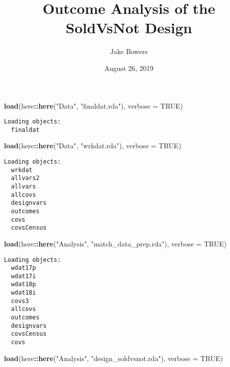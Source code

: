 \documentclass[11pt,]{article}
\title{Outcome Analysis of the SoldVsNot Design}
\author{Jake Bowers}
\date{August 26, 2019}
\newenvironment{Shaded}{\begin{snugshade}}{\end{snugshade}}
\newcommand{\DataTypeTok}[1]{\textcolor[rgb]{0.13,0.29,0.53}{#1}}
\newcommand{\KeywordTok}[1]{\textcolor[rgb]{0.13,0.29,0.53}{\textbf{#1}}}
\newcommand{\NormalTok}[1]{#1}
\newcommand{\OperatorTok}[1]{\textcolor[rgb]{0.81,0.36,0.00}{\textbf{#1}}}
\newcommand{\OtherTok}[1]{\textcolor[rgb]{0.56,0.35,0.01}{#1}}
\newcommand{\StringTok}[1]{\textcolor[rgb]{0.31,0.60,0.02}{#1}}
\begin{document}
\maketitle

{
\setcounter{tocdepth}{2}
\tableofcontents
}
\scriptsize\normalsize

\scriptsize

\begin{Shaded}
\begin{Highlighting}[]
\KeywordTok{load}\NormalTok{(here}\OperatorTok{::}\KeywordTok{here}\NormalTok{(}\StringTok{"Data"}\NormalTok{, }\StringTok{"finaldat.rda"}\NormalTok{), }\DataTypeTok{verbose =} \OtherTok{TRUE}\NormalTok{)}
\end{Highlighting}
\end{Shaded}

\begin{verbatim}
Loading objects:
  finaldat
\end{verbatim}

\begin{Shaded}
\begin{Highlighting}[]
\KeywordTok{load}\NormalTok{(here}\OperatorTok{::}\KeywordTok{here}\NormalTok{(}\StringTok{"Data"}\NormalTok{, }\StringTok{"wrkdat.rda"}\NormalTok{), }\DataTypeTok{verbose =} \OtherTok{TRUE}\NormalTok{)}
\end{Highlighting}
\end{Shaded}

\begin{verbatim}
Loading objects:
  wrkdat
  allvars2
  allvars
  allcovs
  designvars
  outcomes
  covs
  covsCensus
\end{verbatim}

\begin{Shaded}
\begin{Highlighting}[]
\KeywordTok{load}\NormalTok{(here}\OperatorTok{::}\KeywordTok{here}\NormalTok{(}\StringTok{"Analysis"}\NormalTok{, }\StringTok{"match_data_prep.rda"}\NormalTok{), }\DataTypeTok{verbose =} \OtherTok{TRUE}\NormalTok{)}
\end{Highlighting}
\end{Shaded}

\begin{verbatim}
Loading objects:
  wdat17p
  wdat17i
  wdat18p
  wdat18i
  covs3
  allcovs
  outcomes
  designvars
  covsCensus
  covs
\end{verbatim}

\begin{Shaded}
\begin{Highlighting}[]
\KeywordTok{load}\NormalTok{(here}\OperatorTok{::}\KeywordTok{here}\NormalTok{(}\StringTok{"Analysis"}\NormalTok{, }\StringTok{"design_soldvsnot.rda"}\NormalTok{), }\DataTypeTok{verbose =} \OtherTok{TRUE}\NormalTok{)}
\end{Highlighting}
\end{Shaded}
\end{document}
